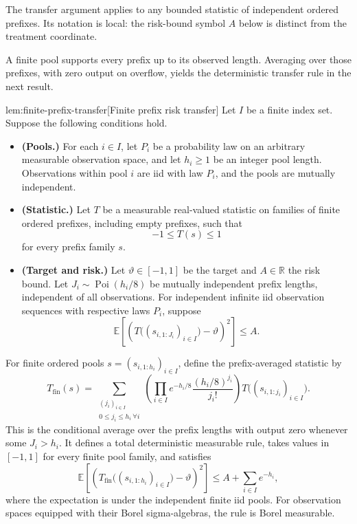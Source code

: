 The transfer argument applies to any bounded statistic of independent ordered prefixes. Its notation is local: the risk-bound symbol \(A\) below is distinct from the treatment coordinate.



A finite pool supports every prefix up to its observed length. Averaging over those prefixes, with zero output on overflow, yields the deterministic transfer rule in the next result.

\begin{lemmav}{lem:finite-prefix-transfer}[Finite prefix risk transfer]
Let \(I\) be a finite index set. Suppose the following conditions hold.
\begin{itemize}
\item \textbf{(Pools.)} For each \(i\in I\), let \(P_i\) be a probability law on an arbitrary measurable observation space, and let \(h_i\geq 1\) be an integer pool length. Observations within pool \(i\) are iid with law \(P_i\), and the pools are mutually independent.
\item \textbf{(Statistic.)} Let \(T\) be a measurable real-valued statistic on families of finite ordered prefixes, including empty prefixes, such that
\[
-1\leq T(s)\leq 1
\]
for every prefix family \(s\).
\item \textbf{(Target and risk.)} Let \(\vartheta\in[-1,1]\) be the target and \(A\in\mathbb R\) the risk bound. Let \(J_i\sim\operatorname{Poi}(h_i/8)\) be mutually independent prefix lengths, independent of all observations. For independent infinite iid observation sequences with respective laws \(P_i\), suppose
\[
\mathbb E\!\left[
\left(T\bigl((s_{i,1:J_i})_{i\in I}\bigr)-\vartheta\right)^2
\right]\leq A.
\]
\end{itemize}
For finite ordered pools \(s=(s_{i,1:h_i})_{i\in I}\), define the prefix-averaged statistic by
\[
T_{\mathrm{fin}}(s)
=
\sum_{\substack{(j_i)_{i\in I}\\0\leq j_i\leq h_i\ \forall i}}
\left(
\prod_{i\in I}
e^{-h_i/8}\frac{(h_i/8)^{j_i}}{j_i!}
\right)
T\bigl((s_{i,1:j_i})_{i\in I}\bigr).
\]
This is the conditional average over the prefix lengths with output zero whenever some \(J_i>h_i\). It defines a total deterministic measurable rule, takes values in \([-1,1]\) for every finite pool family, and satisfies
\[
\mathbb E\!\left[
\left(T_{\mathrm{fin}}\bigl((s_{i,1:h_i})_{i\in I}\bigr)
-\vartheta\right)^2
\right]
\leq A+\sum_{i\in I}e^{-h_i},
\]
where the expectation is under the independent finite iid pools. For observation spaces equipped with their Borel sigma-algebras, the rule is Borel measurable.
\end{lemmav}


